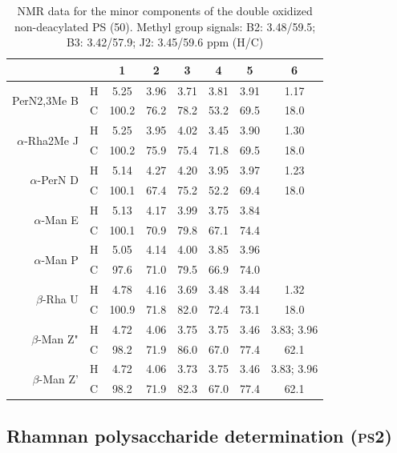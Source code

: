 \begin{table}[htb]
  \centering
  \caption[\Ac{NMR} data for the minor components of the double oxidized non-deacylated \ac{PS}]{\ac{NMR} data for the minor components of the double oxidized non-deacylated \ac{PS} (50\cel). Methyl group signals: B2: 3.48/59.5; B3: 3.42/57.9; J2: 3.45/59.6 ppm (H/C)}
  \label{tbl:lpsends}
  \begin{tabular}{@{}rccccccc@{}}
    \toprule
    &   & 1     & 2    & 3    & 4    & 5    & 6 \\ \midrule
    \multirow{2}{*}{PerN2,3Me B}       & H & 5.25  & 3.96 & 3.71 & 3.81 & 3.91 & 1.17 \\
    & C & 100.2 & 76.2 & 78.2 & 53.2 & 69.5 & 18.0 \\
    \multirow{2}{*}{$\alpha$-Rha2Me J} & H & 5.25  & 3.95 & 4.02 & 3.45 & 3.90 & 1.30 \\
    & C & 100.2 & 75.9 & 75.4 & 71.8 & 69.5 & 18.0 \\
    \multirow{2}{*}{$\alpha$-PerN D}   & H & 5.14  & 4.27 & 4.20 & 3.95 & 3.97 & 1.23 \\
    & C & 100.1 & 67.4 & 75.2 & 52.2 & 69.4 & 18.0 \\
    \multirow{2}{*}{$\alpha$-Man E}    & H & 5.13  & 4.17 & 3.99 & 3.75 & 3.84 & \\
    & C & 100.1 & 70.9 & 79.8 & 67.1 & 74.4 & \\
    \multirow{2}{*}{$\alpha$-Man P}    & H & 5.05  & 4.14 & 4.00 & 3.85 & 3.96 & \\
    & C & 97.6  & 71.0 & 79.5 & 66.9 & 74.0 & \\
    \multirow{2}{*}{$\beta$-Rha U}     & H & 4.78  & 4.16 & 3.69 & 3.48 & 3.44 & 1.32 \\
    & C & 100.9 & 71.8 & 82.0 & 72.4 & 73.1 & 18.0 \\
    \multirow{2}{*}{$\beta$-Man Z"}    & H & 4.72  & 4.06 & 3.75 & 3.75 & 3.46 & 3.83; 3.96 \\
    & C & 98.2  & 71.9 & 86.0 & 67.0 & 77.4 & 62.1 \\
    \multirow{2}{*}{$\beta$-Man Z'}    & H & 4.72  & 4.06 & 3.73 & 3.75 & 3.46 & 3.83; 3.96 \\
    & C & 98.2  & 71.9 & 82.3 & 67.0 & 77.4 & 62.1 \\ \bottomrule
  \end{tabular}
\end{table} %

\subsection{Rhamnan polysaccharide determination (\textsc{ps}2)} %
\label{sub:rhamnan_polysaccharide_determination_ps2_}

